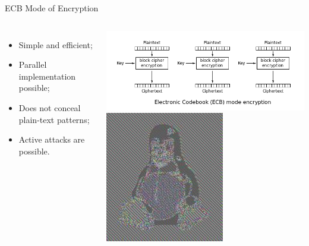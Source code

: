 \documentclass[12pt]{beamer}
\begin{document}
\begin{frame}{ECB Mode of Encryption}
\begin{columns}
\begin{itemize}
\item Simple and efficient;\pause
\item Parallel implementation possible;\pause
\item Does not conceal plain-text patterns;\pause
\item Active attacks are possible.\pause
\end{itemize}
\begin{center}
\includegraphics[scale=.25]{ECB_encryption.png}\pause\\
\includegraphics[scale=.35]{Tux_ecb.jpg}
\end{center}
\end{columns}
\end{frame}
\end{document}

